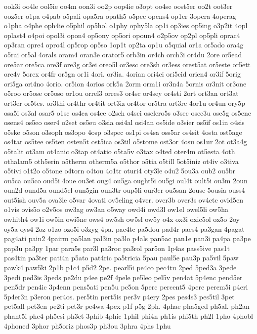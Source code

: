 {ook3i
oo4le
ool5ie
oo4m
oon3i
oo2p
oop4ie
o3opt
oo4se
oost5er
oo2t
oot3er
ooz5er
o1pa
o4pab
o5pali
opa5ra
opath5
o5pec
opens4
op1er
3opera
4operag
o1pha
o4phe
oph4ie
o5phil
op5hol
o1phy
ophy5la
op1i
op3ies
op5ing
o3p2it
4opl
oplast4
o4poi
opol3i
opon4
op5ony
op5ori
opoun4
o2p5ov
op2pl
op5pli
oprac4
op3ran
opre4
opro4l
op5rop
op5so
1op1t
op2ta
op1u
o5quial
or1a
or5ado
ora4g
o5rai
or5al
4orals
oram4
oran3e
orator5
orb3in
or4ch
orch3i
or4du
2ore
or5ead
ore5ar
ore5ca
ore3f
ore3g
or3ei
oreo5l
or3esc
ore3sh
or3ess
orest5at
or5este
or5ett
ore4v
5orex
or4fr
or5gn
or1i
4ori.
or3ia.
4orian
ori4ci
ori5cid
orien4
or3if
5orig
ori5ga
ori4no
4orio.
or5ion
4orios
ork5a
2orm
orm1i
or3n4a
5ornis
or3nit
or3one
o5roo
or5ose
or5oso
or1ou
orrel3
orres3
or4sc
or4sey
or4sti
2ort
ort3an
ort3at
ort3er
or5tes.
or3thi
or4thr
or4tit
ort3iz
or4tor
or5tra
ort3re
4or1u
or4un
ory5p
osa5i
os3al
osar5
o1sc
os4ca
os4ce
o2sch
o4sci
osclero5s
o3sec
osec3u
ose5g
os5enc
osens4
os5eo
oser4
o2set
os5eu
o3sia
osi4al
osi4an
os5ide
o3sier
os5if
os1in
o4sis
o5ske
o5son
o3soph
os3opo
4osp
o3spec
os1pi
os4sa
oss5ar
os4sit
4osta
ost5age
os4tar
os5tee
os5ten
osten5t
ost5ica
os3til
o5stome
ost3or
4osu
os1ur
2ot
ot3a4g
o5talit
ot3am
ot4anic
o3tap
ot4atio
o5ta5v
o3tax
o4ted
oter4m
ot5esta
4oth
othalam5
oth5erin
o5therm
otherm5a
o5thor
o5tia
o5till
5ot5iniz
ot4iv
o3tiva
o5tivi
o1t2o
o5tone
o4torn
o4tou
4o1tr
oturi4
oty3le
o4u2
5ou3a
oub2
ou5br
ou5ca
ou5co
oud5i
4oue
ou3et
oug4
ou5ga
ought5i
ou5gi
oul4t
oult5i
ou3m
2oun
oun2d
ound5a
ound5el
oun5gin
oun3tr
oup5li
our3er
ou5san
2ouse
5ousia
ouss4
out5ish
ouv5a
ova3le
o5var
4ovati
ov5eling
o4ver.
over3b
over3s
ov4ete
ovid5en
o1vis
ovis5o
o2v5os
ow3ag
ow3an
o5way
owd4i
owd3l
ow1el
owel5li
ow5ha
owhith4
ow1i
ow5in
owi5ne
ows4
ow5sh
ow5sl
ow5y
o4x
ox3i
oxic5ol
ox5o
2oy
oy5a
oys4
2oz
o1zo
ozo5i
o3zyg
4pa.
pac4te
pa5dou
pad4r
paes4
pa3gan
4pagat
pag4ati
pain2
4pairm
pa5lan
pal3in
pa3lo
p4als
pan5ac
pan1e
pan3i
pa4pa
pa3pe
pap3u
pa3py
1par
para5s
par3l
pa3roc
pa3rol
par5on
1p4as
pass5ive
pas1t
pas4tin
pa3ter
pati4n
p5ato
pat4ric
pa5tricia
5pau
paul5e
pau3p
pa5vil
5paw
pawk4
paw5ki
2p1b
p1c4
p5d2
2pe.
pearl5i
pe4co
pec4tu
2ped
5ped3a
3pede
3pedi
ped3is
3peds
pe2du
p4ee
pe2f
4pele
pe5leo
pel5v
pen4at
5p4enc
pend5er
pen5dr
pen4ic
3p4enn
pens5ati
pen5u
pe5on
5perc
percent5
4pere
perem5i
p4eri
5p4er3n
p3eron
per4os.
per5tin
pert5is
per3v
p4ery
2pes
pes4s3
pes5til
3pet
pet5all
pet3en
pe2ti
pet3r
pe4wa
4pex
p1f
p5g
2ph.
4phae
pha5ged
ph5al.
ph2an
phant5i
phe4
ph5esi
ph3et
3phib
4phic
1phil
phi4n
ph1is
phi5th
ph2l
1pho
4phobl
4phoned
3phor
ph5oriz
phos3p
ph3ou
3phra
4phs
1phu
}
